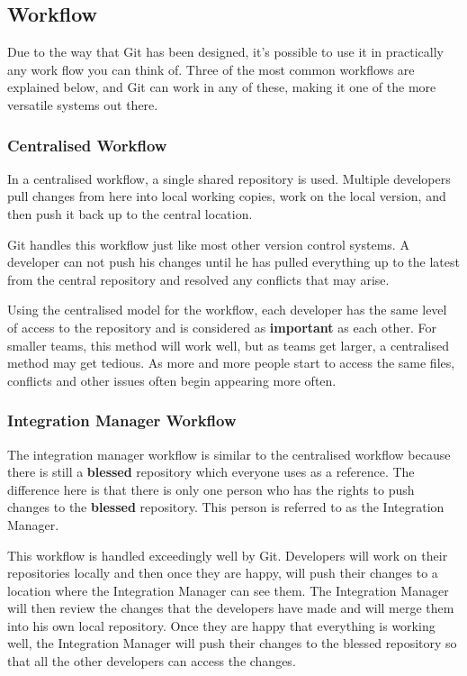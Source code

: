 \subsection{Workflow}
Due to the way that Git has been designed, it's possible to use it in practically any work flow you can think of.
Three of the most common workflows are explained below, and Git can work in any of these, making it one of the more versatile systems out there.

\subsubsection{Centralised Workflow}
In a centralised workflow, a single shared repository is used.
Multiple developers pull changes from here into local working copies, work on the local version, and then push it back up to the central location.

Git handles this workflow just like most other version control systems.
A developer can not push his changes until he has pulled everything up to the latest from the central repository and resolved any conflicts that may arise.

Using the centralised model for the workflow, each developer has the same level of access to the repository and is considered as \textbf{important} as each other.
For smaller teams, this method will work well, but as teams get larger, a centralised method may get tedious.
As more and more people start to access the same files, conflicts and other issues often begin appearing more often.


\subsubsection{Integration Manager Workflow}
The integration manager workflow is similar to the centralised workflow because there is still a \textbf{blessed} repository which everyone uses as a reference.
The difference here is that there is only one person who has the rights to push changes to the \textbf{blessed} repository.
This person is referred to as the Integration Manager.

This workflow is handled exceedingly well by Git.
Developers will work on their repositories locally and then once they are happy, will push their changes to a location where the Integration Manager can see them.
The Integration Manager will then review the changes that the developers have made and will merge them into his own local repository.
Once they are happy that everything is working well, the Integration Manager will push their changes to the blessed repository so that all the other developers can access the changes.

